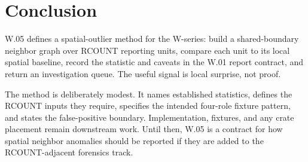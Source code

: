 \section{Conclusion}

W.05 defines a spatial-outlier method for the W-series: build a
shared-boundary neighbor graph over RCOUNT reporting units, compare each unit to
its local spatial baseline, record the statistic and caveats in the W.01 report
contract, and return an investigation queue. The useful signal is local
surprise, not proof.

The method is deliberately modest. It names established statistics, defines the
RCOUNT inputs they require, specifies the intended four-role fixture pattern,
and states the false-positive boundary. Implementation, fixtures, and any crate
placement remain downstream work. Until then, W.05 is a contract for how spatial
neighbor anomalies should be reported if they are added to the RCOUNT-adjacent
forensics track.

